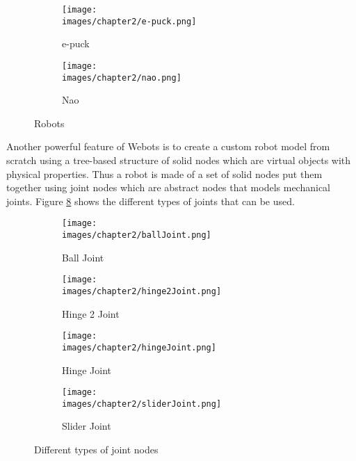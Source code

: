 \begin{figure}[h!]
  \centering
  \begin{subfigure}[b]{0.3\linewidth}
  	\texttt{[image: \\images/chapter2/e-puck.png]}
  	\caption{e-puck}
  	\label{fig:ch-2:e-puck}
  \end{subfigure}
  \begin{subfigure}[b]{0.35\linewidth}
  	\texttt{[image: \\images/chapter2/nao.png]}
  	\caption{Nao}
  	\label{fig:ch-2:nao}
  \end{subfigure}
  \caption{Robots}
\end{figure}

Another powerful feature of Webots is to create a custom robot model from scratch using a tree-based structure of solid nodes which are virtual objects with physical properties. Thus a robot is made of a set of solid nodes put them together using joint nodes which are abstract nodes that models mechanical joints. Figure \ref{fig:ch-2:joints} shows the different types of joints that can be used.

\begin{figure}[h!]
  \centering
  \begin{subfigure}[b]{0.47\linewidth}
  	\texttt{[image: \\images/chapter2/ballJoint.png]}
  	\caption{Ball Joint}
  	\label{fig:ch-2:ball-joint}
  \end{subfigure}
  \vspace{0.00mm}
  \begin{subfigure}[b]{0.47\linewidth}
  	\texttt{[image: \\images/chapter2/hinge2Joint.png]}
  	\caption{Hinge 2 Joint}
  	\label{fig:ch-2:highe-2-joint}
  \end{subfigure}
  \vspace{0.00mm}
  \begin{subfigure}[b]{0.47\linewidth}
  	\texttt{[image: \\images/chapter2/hingeJoint.png]}
  	\caption{Hinge Joint}
  	\label{fig:ch-2:hinge-joint}
  \end{subfigure}
  \vspace{0.00mm}
  \begin{subfigure}[b]{0.47\linewidth}
  	\texttt{[image: \\images/chapter2/sliderJoint.png]}
  	\caption{Slider Joint}
  	\label{fig:ch-2:slider-joint}
  \end{subfigure}
  \caption{Different types of joint nodes}
  \label{fig:ch-2:joints}
\end{figure}


